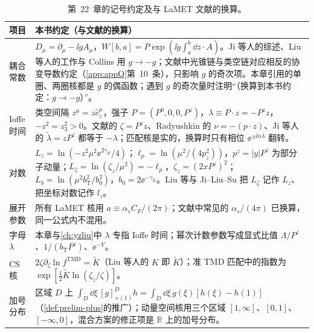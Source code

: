 \begin{table}[htbp]
\centering
\small
\renewcommand{\arraystretch}{1.12}
\begin{tabularx}{\textwidth}{@{}p{2.3cm}X@{}}
\toprule
项目 & 本书约定（与文献的换算） \\
\midrule
耦合常数 & $D_\mu=\partial_\mu-\ii gA_\mu$，$W[b,a]=P\exp(\ii g\int_a^b\dd z\cdot A)$。Ji 等人的综述\cite{JiEtAl2021}、Liu 等人的工作与 Collins 用 $g\to-g$；文献\cite{IzubuchiEtAl2018}中光锥链与类空链对应相反的协变导数约定（\cref{app:appQ}第~10~条），只影响 $g$ 的奇次项。本章引用的单圈、两圈核都是 $g$ 的偶函数；遇到 $g$ 的奇次量时注明“（换算到本书约定：$g\to-g$）”。 \\
Ioffe 时间 & 类空间隔 $z^\mu=z\hat e_z^\mu$，强子 $P=(P^0,0,0,P^z)$，$\lambda\equiv P\cdot z=-P^zz$，$-z^2=z_3^2>0$。文献\cite{IzubuchiEtAl2018}的 $\zeta=P^zz$、Radyushkin 的 $\nu=-(p\cdot z)$、Ji 等人的 $\tilde\lambda=zP^z$ 都等于 $-\lambda$；匹配核是实的，换算时只有相位 $\ee^{\pm\ii\alpha\lambda}$ 翻转。 \\
对数 & $L_z=\ln(-z^2\mu^2\ee^{2\gamma_E}/4)$；$\ell_p=\ln(\mu^2/(4p_z^2))$，$p^z=|y|P^z$ 为部分子动量；$L_\zeta=\ln(\zeta_z/\mu^2)=-\ell_p$，$\zeta_z=(2xP^z)^2$；$L_b=\ln(\mu^2b_{\mathrm T}^2/b_0^2)$，$b_0=2\ee^{-\gamma_E}$。Liu 等与 Ji--Liu--Su 把 $L_\zeta$ 记作 $L_z$、把坐标对数记作 $l_z$。 \\
展开参数 & 所有 LaMET 核用 $a\equiv\alpha_sC_F/(2\pi)$；文献中常见的 $\alpha_s/(4\pi)$ 已换算，同一公式内不混用。 \\
字母 $\lambda$ & 本章与\cref{ch:yzliu}中 $\lambda$ 专指 Ioffe 时间；幂次计数参数写成显式比值 $\Lambda/P^z$、$1/(b_{\mathrm T}P^z)$、$\ee^{-Y}$。 \\
CS 核 & $2\zeta\partial_\zeta\ln f^{\mathrm{TMD}}=\tilde K$（Liu 等人的 $K$ 即 $\tilde K$）；准 TMD 匹配中的指数为 $\exp[\frac12\tilde K\ln(\zeta_z/\zeta)]$。 \\
加号分布 & 区域 $D$ 上 $\int_D\dd\xi\,[g]^D_{+(1)}h=\int_D\dd\xi\,g(\xi)[h(\xi)-h(1)]$（\cref{def:prelim-plus}的推广）；动量空间核用三个区域 $[1,\infty]$、$[0,1]$、$[-\infty,0]$，混合方案的修正项是 $\mathbb R$ 上的加号分布。 \\
\bottomrule
\end{tabularx}
\caption{第~22~章的记号约定及与 LaMET 文献的换算。}
\label{tab:lamet-conventions}
\end{table}

